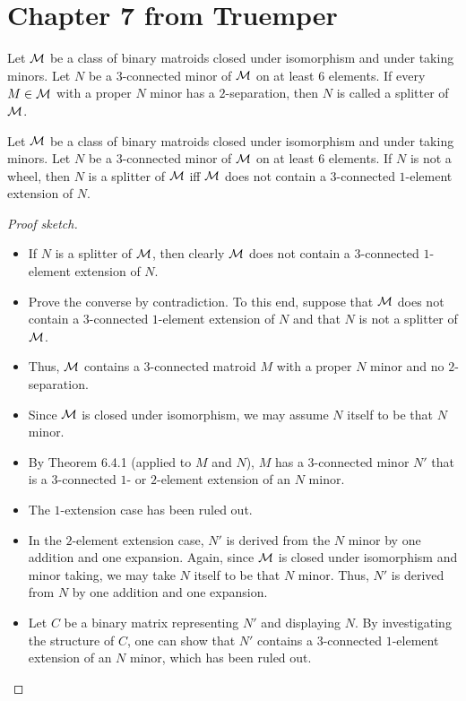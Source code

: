 \section{Chapter 7 from Truemper}

\begin{definition}[splitter]
  \label{def:splitter}
  Let $\mathcal{M}$ be a class of binary matroids closed under isomorphism and under taking minors. Let $N$ be a $3$-connected minor of $\mathcal{M}$ on at least $6$ elements.
  If every $M \in \mathcal{M}$ with a proper $N$ minor has a $2$-separation, then $N$ is called a splitter of $\mathcal{M}$.
\end{definition}

\begin{theorem}
  \label{thm:7.2.1.a}
  Let $\mathcal{M}$ be a class of binary matroids closed under isomorphism and under taking minors. Let $N$ be a $3$-connected minor of $\mathcal{M}$ on at least $6$ elements.
  If $N$ is not a wheel, then $N$ is a splitter of $\mathcal{M}$ iff $\mathcal{M}$ does not contain a $3$-connected $1$-element extension of $N$.
\end{theorem}

\begin{proof}[Proof sketch]
  \begin{itemize}
    \item If $N$ is a splitter of $\mathcal{M}$, then clearly $\mathcal{M}$ does not contain a $3$-connected $1$-element extension of $N$.
    \item Prove the converse by contradiction. To this end, suppose that $\mathcal{M}$ does not contain a $3$-connected $1$-element extension of $N$ and that $N$ is not a splitter of $\mathcal{M}$.
    \item Thus, $\mathcal{M}$ contains a $3$-connected matroid $M$ with a proper $N$ minor and no $2$-separation.
    \item Since $\mathcal{M}$ is closed under isomorphism, we may assume $N$ itself to be that $N$ minor.
    \item By Theorem 6.4.1 (applied to $M$ and $N$), $M$ has a $3$-connected minor $N'$ that is a $3$-connected $1$- or $2$-element extension of an $N$ minor.
    \item The $1$-extension case has been ruled out.
    \item In the $2$-element extension case, $N'$ is derived from the $N$ minor by one addition and one expansion. Again, since $\mathcal{M}$ is closed under isomorphism and minor taking, we may take $N$ itself to be that $N$ minor. Thus, $N'$ is derived from $N$ by one addition and one expansion.
    \item Let $C$ be a binary matrix representing $N'$ and displaying $N$. By investigating the structure of $C$, one can show that $N'$ contains a $3$-connected $1$-element extension of an $N$ minor, which has been ruled out.
  \end{itemize}
\end{proof}

